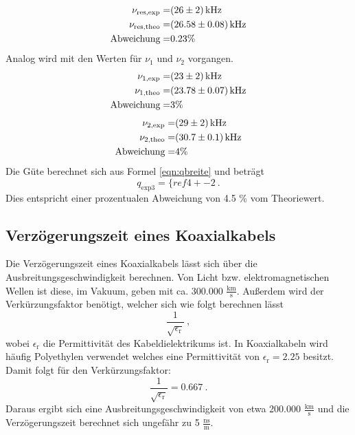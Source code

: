 \begin{eqnarray}
  \nu_\text{res,exp} =&  (\num{26 +- 2}) \, \text{kHz}			\\
  \nu_\text{res,theo} =& (\num{26.58 +- 0.08}) \, \text{kHz} \\
  \text{Abweichung} =& 0.23 \%
  \label{eqn:res}
\end{eqnarray}
Analog wird mit den Werten für $\nu_1$ und $\nu_2$ vorgangen.
\begin{eqnarray}
  \nu_\text{1,exp} =&  (\num{23 +- 2}) \, \text{kHz}                 \\
  \nu_\text{1,theo} =& (\num{23.78 +- 0.07}) \, \text{kHz} \\
  \text{Abweichung} =& 3 \%
\end{eqnarray}
\begin{eqnarray}
  \nu_\text{2,exp} =&  (\num{29 +- 2}) \, \text{kHz}                 \\
  \nu_\text{2,theo} =& (\num{30.7 +- 0.1}) \, \text{kHz} \\
  \text{Abweichung} =& 4 \%
\end{eqnarray}
Die Güte berechnet sich aus Formel \ref{eqn:qbreite} und beträgt
\begin{equation}
  q_\text{exp3} = \{ref{4 +- 2}  \ .
  \label{eqn:q3}
\end{equation}
Dies entspricht einer prozentualen Abweichung von 4.5 \% vom Theoriewert.

\subsection{Verzögerungszeit eines Koaxialkabels}
Die Verzögerungszeit eines Koaxialkabels lässt sich über die Ausbreitungsgeschwindigkeit berechnen. Von Licht bzw. elektromagnetischen Wellen ist diese, im Vakuum, geben mit ca. 300.000 $\frac{\text{km}}{\text{s}}$. Außerdem wird der Verkürzungsfaktor benötigt, welcher sich wie folgt berechnen lässt
\begin{equation*}
  \frac{1}{\sqrt{\epsilon_\text{r}}} \ ,
\end{equation*}
wobei $\epsilon_\text{r}$ die Permittivität des Kabeldielektrikums ist.
In Koaxialkabeln wird häufig Polyethylen verwendet welches eine Permittivität von $\epsilon_\text{r} = 2.25$ besitzt. Damit folgt für den Verkürzungsfaktor:
\begin{equation*}
  \frac{1}{\sqrt{\epsilon_\text{r}}} = 0.667 \ .
\end{equation*}
Daraus ergibt sich eine Ausbreitungsgeschwindigkeit von etwa 200.000 $\frac{\text{km}}{\text{s}}$ und die Verzögerungszeit berechnet sich ungefähr zu 5 $\frac{\text{ns}}{\text{m}}$.
